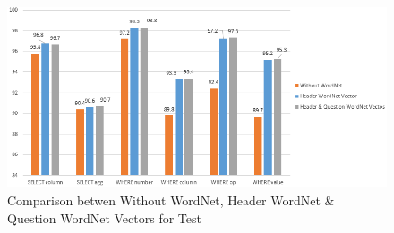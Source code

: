 \documentclass[12pt]{article}
\begin{document}
\begin{figure}[H]
    \includegraphics[width=400pt]{testset}
    \caption{Comparison betwen Without WordNet, Header WordNet \&  Question WordNet Vectors for Test}
    \label{testset}
\end{figure}



\end{document}
